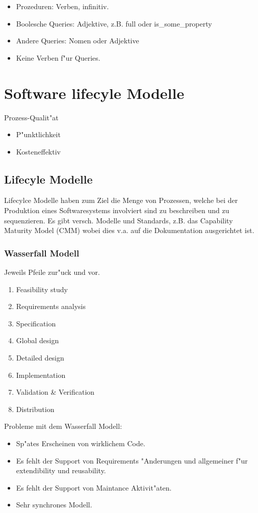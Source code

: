 \documentclass[german, 10pt, a4paper, twocolumn]{scrartcl}
\theoremstyle{definition}
\begin{document}
\begin{itemize}
	\item Prozeduren: Verben, infinitiv.
	\item Boolesche Queries: Adjektive, z.B. full oder is\_some\_property
	\item Andere Queries: Nomen oder Adjektive
	\item Keine Verben f"ur Queries.
\end{itemize}

\section{Software lifecyle Modelle}

Prozess-Qualit"at
\begin{itemize}
	\item P"unktlichkeit
	\item Kosteneffektiv
\end{itemize}

\subsection{Lifecyle Modelle}

Lifecylce Modelle haben zum Ziel die Menge von Prozessen, welche bei der Produktion eines Softwaresystems involviert sind zu beschreiben und zu sequenzieren. Es gibt versch. Modelle und Standards, z.B. das Capability Maturity Model (CMM) wobei dies v.a. auf die Dokumentation ausgerichtet ist.

\subsubsection{Wasserfall Modell}

Jeweils Pfeile zur"uck und vor.

\begin{enumerate}
	\item Feasibility study
	\item Requirements analysis
	\item Specification
	\item Global design
	\item Detailed design
	\item Implementation
	\item Validation \& Verification
	\item Distribution
\end{enumerate}

Probleme mit dem Wasserfall Modell:
\begin{itemize}
	\item Sp"ates Erscheinen von wirklichem Code.
	\item Es fehlt der Support von Requirements "Anderungen und allgemeiner f"ur extendibility und reusability.
	\item Es fehlt der Support von Maintance Aktivit"aten.
	\item Sehr synchrones Modell.
\end{itemize}
\end{document}
